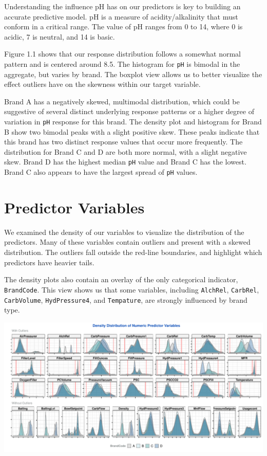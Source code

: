\documentclass[]{report}
\begin{document}
Understanding the influence pH has on our predictors is key to building
an accurate predictive model. pH is a measure of acidity/alkalinity that
must conform in a critical range. The value of pH ranges from 0 to 14,
where 0 is acidic, 7 is neutral, and 14 is basic.

Figure 1.1 shows that our response distribution follows a somewhat
normal pattern and is centered around 8.5. The histogram for \texttt{pH}
is bimodal in the aggregate, but varies by brand. The boxplot view
allows us to better visualize the effect outliers have on the skewness
within our target variable.

Brand A has a negatively skewed, multimodal distribution, which could be
suggestive of several distinct underlying response patterns or a higher
degree of variation in \texttt{pH} response for this brand. The density
plot and histogram for Brand B show two bimodal peaks with a slight
positive skew. These peaks indicate that this brand has two distinct
response values that occur more frequently. The distribution for Brand C
and D are both more normal, with a slight negative skew. Brand D has the
highest median \texttt{pH} value and Brand C has the lowest. Brand C
also appears to have the largest spread of \texttt{pH} values.

\hypertarget{predictor-variables}{%
\section{Predictor Variables}\label{predictor-variables}}

We examined the density of our variables to visualize the distribution
of the predictors. Many of these variables contain outliers and present
with a skewed distribution. The outliers fall outside the red-line
boundaries, and highlight which predictors have heavier tails.

The density plots also contain an overlay of the only categorical
indicator, \texttt{BrandCode}. This view shows us that some variables,
including \texttt{AlchRel}, \texttt{CarbRel}, \texttt{CarbVolume},
\texttt{HydPressure4}, and \texttt{Tempature}, are strongly influenced
by brand type.

\includegraphics{Proj2-JM_files/figure-latex/unnamed-chunk-4-1.pdf}
\end{document}
